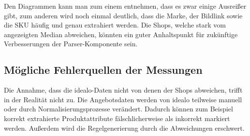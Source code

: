 Den Diagrammen kann man zum einem entnehmen, dass es zwar einige Ausreißer gibt, zum anderen wird noch einmal
deutlich, dass die Marke, der Bildlink sowie die SKU häufig und genau extrahiert werden.
Die Shops, welche stark vom angezeigten Median abweichen, könnten ein guter Anhaltspunkt für zukünftige Verbesserungen
der Parser-Komponente sein.

\subsection{Mögliche Fehlerquellen der Messungen}
\label{subsec:fehlerquellen}

Die Annahme, dass die idealo-Daten nicht von denen der Shops abweichen, trifft in der Realität nicht zu.
Die Angebotsdaten werden von idealo teilweise manuell oder durch Normalisierungsprozesse verändert.
Dadurch können zum Beispiel korrekt extrahierte Produktattribute fälschlicherweise als inkorrekt markiert werden.
Außerdem wird die Regelgenerierung durch die Abweichungen erschwert.